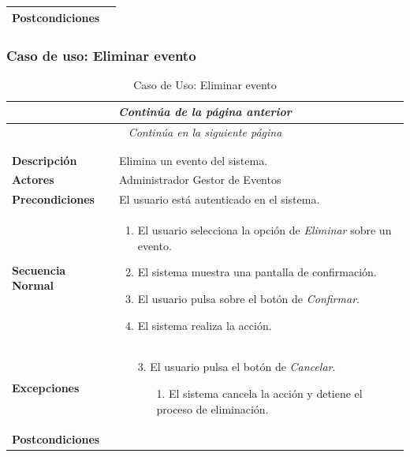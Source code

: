 \begin{longtable}{| p{4cm} | p{10cm} |}
\hline
\textbf{Postcondiciones} & \\
\hline
\end{longtable}



\newpage
\subsubsection*{Caso de uso: Eliminar evento }
\begin{longtable}{| p{4cm} | p{10cm} |}
\endfirsthead
\multicolumn{2}{c}{\textit{Continúa de la página anterior}}\\[12pt]
\hline
\endhead
\hline
\multicolumn{2}{c}{\textit{Continúa en la siguiente página}} \\
\endfoot
\hline
\caption{Caso de Uso: Eliminar evento}\label{fig:1}\\
\endlastfoot


\hline
\multicolumn{2}{|c|}{\textbf{CU$<$40$>$ - Eliminar Evento}} \\

\hline
\textbf{Descripción} &
Elimina un evento del sistema.\\

\hline
\textbf{Actores} &
Administrador\newline
Gestor de Eventos\\

\hline
\textbf{Precondiciones} &
El usuario está autenticado en el sistema.\\

\hline
\textbf{Secuencia Normal} &\mbox{}\par\vspace{-\baselineskip}
\begin{enumerate}[leftmargin=0.7cm, topsep=0.1cm]
\item El usuario selecciona la opción de \textit{Eliminar} sobre un evento.
\item El sistema muestra una pantalla de confirmación.
\item El usuario pulsa sobre el botón de \textit{Confirmar}.
\item El sistema realiza la acción.
\end{enumerate}


\\
\hline
\textbf{Excepciones} &\mbox{}\par\vspace{-\baselineskip}
\begin{enumerate}[leftmargin=0.9cm, topsep=0.1cm]
\item[3.] El usuario pulsa el botón de \textit{Cancelar}.
	\begin{itemize}
	\item[1.] El sistema cancela la acción y detiene el proceso de eliminación.
	\end{itemize}
\end{enumerate}
\\

\hline
\textbf{Postcondiciones} & \\
\hline
\end{longtable}



